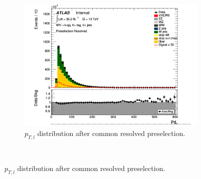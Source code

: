 \begin{figure}[ht]
\begin{subfigure}{0.3\textwidth}
            \includegraphics[width=\linewidth]{figures/1lep/CRPlots/C_0ptag0pjet_0ptv_Presel_Resolved_PtL_Lin.png}
            \caption{$p_{T,l}$ distribution after common resolved preselection.}
        \end{subfigure} \\


\end{figure}
